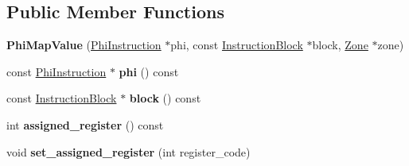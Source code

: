 \subsection*{Public Member Functions}
\begin{DoxyCompactItemize}
\item 
{\bfseries Phi\+Map\+Value} (\hyperlink{classv8_1_1internal_1_1compiler_1_1_phi_instruction}{Phi\+Instruction} $\ast$phi, const \hyperlink{classv8_1_1internal_1_1compiler_1_1_instruction_block}{Instruction\+Block} $\ast$block, \hyperlink{classv8_1_1internal_1_1_zone}{Zone} $\ast$zone)\hypertarget{classv8_1_1internal_1_1compiler_1_1_register_allocation_data_1_1_phi_map_value_a0a575ec31969824de846252333512f8f}{}\label{classv8_1_1internal_1_1compiler_1_1_register_allocation_data_1_1_phi_map_value_a0a575ec31969824de846252333512f8f}

\item 
const \hyperlink{classv8_1_1internal_1_1compiler_1_1_phi_instruction}{Phi\+Instruction} $\ast$ {\bfseries phi} () const \hypertarget{classv8_1_1internal_1_1compiler_1_1_register_allocation_data_1_1_phi_map_value_a5aa48887ce96f31a041c8d574dfe80a9}{}\label{classv8_1_1internal_1_1compiler_1_1_register_allocation_data_1_1_phi_map_value_a5aa48887ce96f31a041c8d574dfe80a9}

\item 
const \hyperlink{classv8_1_1internal_1_1compiler_1_1_instruction_block}{Instruction\+Block} $\ast$ {\bfseries block} () const \hypertarget{classv8_1_1internal_1_1compiler_1_1_register_allocation_data_1_1_phi_map_value_a51df7a5347d6b00819c452646b75e4d9}{}\label{classv8_1_1internal_1_1compiler_1_1_register_allocation_data_1_1_phi_map_value_a51df7a5347d6b00819c452646b75e4d9}

\item 
int {\bfseries assigned\+\_\+register} () const \hypertarget{classv8_1_1internal_1_1compiler_1_1_register_allocation_data_1_1_phi_map_value_acdfa4793c8c88efe57bff01046791e4d}{}\label{classv8_1_1internal_1_1compiler_1_1_register_allocation_data_1_1_phi_map_value_acdfa4793c8c88efe57bff01046791e4d}

\item 
void {\bfseries set\+\_\+assigned\+\_\+register} (int register\+\_\+code)\hypertarget{classv8_1_1internal_1_1compiler_1_1_register_allocation_data_1_1_phi_map_value_ad878f5cd5be5623656f415e7a71c07c3}{}\label{classv8_1_1internal_1_1compiler_1_1_register_allocation_data_1_1_phi_map_value_ad878f5cd5be5623656f415e7a71c07c3}


\end{DoxyCompactItemize}
